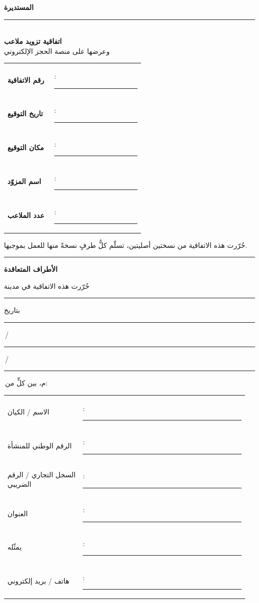 \documentclass[12pt,a4paper]{article}
\newcommand{\blank}[1][3.2cm]{\rule[-0.4ex]{#1}{0.5pt}}
\newcommand{\mlh}[1]{{\bfseries #1}}
\begin{document}
\thispagestyle{empty}
\begin{center}
\vspace*{2.2cm}
{\color{teal}\bfseries\fontsize{30}{36}\selectfont المستديرة}\\[4pt]
{\color{lime}\rule{5cm}{2.5pt}}\\[26pt]
{\bfseries\fontsize{22}{28}\selectfont اتفاقية تزويد ملاعب}\\[8pt]
{\fontsize{16}{20}\selectfont وعرضها على منصة الحجز الإلكتروني}\\[36pt]

\begin{tabular}{@{}p{0.32\linewidth}@{}p{0.62\linewidth}@{}}
\mlh{رقم الاتفاقية} & : \blank[6cm]\\[8pt]
\mlh{تاريخ التوقيع}  & : \blank[6cm]\\[8pt]
\mlh{مكان التوقيع}   & : \blank[6cm]\\[8pt]
\mlh{اسم المزوّد}     & : \blank[6cm]\\[8pt]
\mlh{عدد الملاعب}    & : \blank[6cm]\\
\end{tabular}

\vfill
{\small\color{teal}
حُرّرت هذه الاتفاقية من نسختين أصليتين، تسلّم كلُّ طرفٍ نسخةً منها للعمل بموجبها.}\\[6pt]
{\scriptsize\color{rule}\rule{0.5\linewidth}{0.4pt}}
\end{center}
\newpage

\begin{center}
{\color{teal}\bfseries\Large الأطراف المتعاقدة}
\end{center}
\vspace{4pt}

حُرّرت هذه الاتفاقية في مدينة \blank[3cm] بتاريخ \blank[1.2cm]\,/\,\blank[1.2cm]\,/\,\blank[1.8cm]\,م، بين كلٍّ من:

\vspace{8pt}
\begin{tabular}{@{}p{0.30\linewidth}@{}p{0.66\linewidth}@{}}
الاسم / الكيان        & : \blank[8cm]\\[6pt]
الرقم الوطني للمنشأة  & : \blank[8cm]\\[6pt]
السجل التجاري / الرقم الضريبي & : \blank[8cm]\\[6pt]
العنوان               & : \blank[8cm]\\[6pt]
يمثّله                & : \blank[8cm]\\[6pt]
هاتف / بريد إلكتروني  & : \blank[8cm]\\
\end{tabular}
\end{document}
